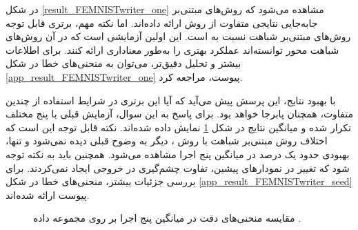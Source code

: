 در شکل
\ref{result_FEMNISTwriter_one}
مشاهده می‌شود که روش‌های مبتنی‌بر جابه‌جایی نتایجی متفاوت از روش
ارائه داده‌اند. اما نکته مهم، برتری قابل توجه روش‌های مبتنی‌بر شباهت نسبت به
است. این اولین آزمایشی است که در آن روش‌های شباهت محور توانسته‌اند عملکرد بهتری را به‌طور معناداری ارائه کنند. برای اطلاعات بیشتر و تحلیل دقیق‌تر، می‌توان به منحنی‌های خطا در شکل
\ref{app_result_FEMNISTwriter_one}
پیوست، مراجعه کرد.



با بهبود نتایج، این پرسش پیش می‌آید که آیا این برتری در شرایط استفاده از چندین
متفاوت، همچنان پابرجا خواهد بود. برای پاسخ به این سوال، آزمایش قبلی با پنج
مختلف تکرار شده و میانگین نتایج در شکل
\ref{result_FEMNISTwriter_seed}
نمایش داده شده‌اند. نکته قابل توجه این است که اختلاف روش مبتنی‌بر شباهت با روش
%
، دیگر به وضوح قبلی دیده نمی‌شود و تنها، بهبودی حدود یک درصد در میانگین پنج اجرا مشاهده می‌شود.
همچنین باید به نکته توجه شود که تغییر
در نمودارهای پیشین، تفاوت چشم‌گیری در خروجی ایجاد نمی‌کردند.
برای بررسی جزئیات بیشتر، منحنی‌های خطا در شکل
\ref{app_result_FEMNISTwriter_seed}
پیوست ارائه شده‌اند.

\begin{figure}[h]
	\centering
	\hspace{0.8mm}
	\caption{
		مقایسه منحنی‌های دقت در میانگین پنج اجرا بر روی مجموعه داده
		.		
	}
	\label{result_FEMNISTwriter_seed}
\end{figure}







